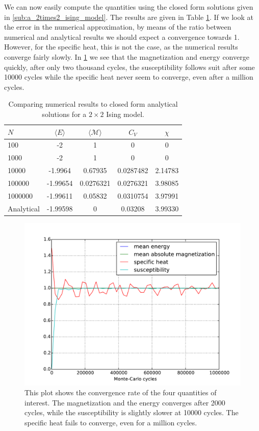 We can now easily compute the quantities using the closed form solutions given
in \cref{sub:a_2times2_ising_model}. The results are given in Table
\ref{tab:numerical comparison to analytical 2x2}. If we look at the error in
the numerical approximation, by means of the ratio between numerical and
analytical results we should expect a convergence towards 1. However, for the
specific heat, this is not the case, as the numerical results converge fairly
slowly. In \cref{fig:relative_error_1} we see that the magnetization and energy
converge quickly, after only two thousand cycles, the susceptibility follows
suit after some 10000 cycles while the specific heat never seem to converge,
even after a million cycles.
\begin{table}
  \centering
  \caption{Comparing numerical results to closed form analytical solutions for a $2\times2$ Ising model.}
  \label{tab:numerical comparison to analytical 2x2}
  \begin{tabular}{lcccc}
    \hline
    $N$ & $\langle E \rangle$ & $\langle \mathcal{M} \rangle$ & $C_V$ & $\chi$\\
    \hline
    100 & -2& 1 & 0& 0\\
    1000 & -2& 1& 0& 0 \\
    10000 & -1.9964& 0.67935& 0.0287482& 2.14783 \\
    100000 & -1.99654& 0.0276321& 0.0276321& 3.98085 \\
    1000000 & -1.99611& 0.05832& 0.0310754& 3.97991 \\
    \hline
    Analytical & -1.99598 & 0 & 0.03208 & 3.99330
  \end{tabular}
\end{table}
\begin{figure}
  \centering
  \includegraphics[width=0.8\linewidth]{task_b_million.pdf}
  \caption{This plot shows the convergence rate of the four quantities of
  interest. The magnetization and the energy converges after 2000 cycles, while
the susceptibility is slightly slower at 10000 cycles. The specific heat fails
to converge, even for a million cycles.}
  \label{fig:relative_error_1}
\end{figure}
